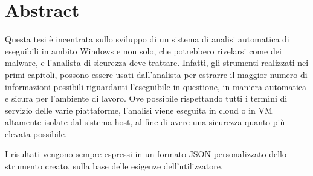 \section*{Abstract}
Questa tesi è incentrata sullo sviluppo di un sistema di analisi automatica di eseguibili in ambito Windows e non solo, che potrebbero rivelarsi come dei malware, e l'analista di sicurezza deve trattare.
Infatti, gli strumenti realizzati nei primi capitoli, possono essere usati dall'analista per estrarre il maggior numero di informazioni possibili riguardanti l'eseguibile in questione, in maniera automatica e sicura per l'ambiente di lavoro.
Ove possibile rispettando tutti i termini di servizio delle varie piattaforme, l'analisi viene eseguita in cloud o in VM altamente isolate dal sistema host, al fine di avere una sicurezza quanto più elevata possibile.

I risultati vengono sempre espressi in un formato JSON personalizzato dello strumento creato, sulla base delle esigenze dell'utilizzatore.
